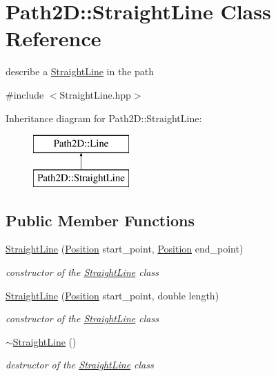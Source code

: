 \hypertarget{class_path2_d_1_1_straight_line}{}\section{Path2D\+:\+:Straight\+Line Class Reference}
\label{class_path2_d_1_1_straight_line}


describe a \mbox{\hyperlink{class_path2_d_1_1_straight_line}{Straight\+Line}} in the path  




{\ttfamily \#include $<$Straight\+Line.\+hpp$>$}

Inheritance diagram for Path2D\+:\+:Straight\+Line\+:\begin{figure}[H]
\begin{center}
\leavevmode
\includegraphics[height=2.000000cm]{class_path2_d_1_1_straight_line}
\end{center}
\end{figure}
\subsection*{Public Member Functions}
\begin{DoxyCompactItemize}
\item 
\mbox{\hyperlink{class_path2_d_1_1_straight_line_af93144db1f27739f00be60bd4af99951}{Straight\+Line}} (\mbox{\hyperlink{class_path2_d_1_1_position}{Position}} start\+\_\+point, \mbox{\hyperlink{class_path2_d_1_1_position}{Position}} end\+\_\+point)
\begin{DoxyCompactList}\small\item\em constructor of the \mbox{\hyperlink{class_path2_d_1_1_straight_line}{Straight\+Line}} class \end{DoxyCompactList}\item 
\mbox{\hyperlink{class_path2_d_1_1_straight_line_a5c7e7a686ab56de56c4a00f97bb86fd7}{Straight\+Line}} (\mbox{\hyperlink{class_path2_d_1_1_position}{Position}} start\+\_\+point, double length)
\begin{DoxyCompactList}\small\item\em constructor of the \mbox{\hyperlink{class_path2_d_1_1_straight_line}{Straight\+Line}} class \end{DoxyCompactList}\item 
\mbox{\label{class_path2_d_1_1_straight_line_a9e3da1895d0b13c3aaeb561344c4fb80}} 
\mbox{\hyperlink{class_path2_d_1_1_straight_line_a9e3da1895d0b13c3aaeb561344c4fb80}{$\sim$\+Straight\+Line}} ()
\begin{DoxyCompactList}\small\item\em destructor of the \mbox{\hyperlink{class_path2_d_1_1_straight_line}{Straight\+Line}} class \end{DoxyCompactList}\end{DoxyCompactItemize}


